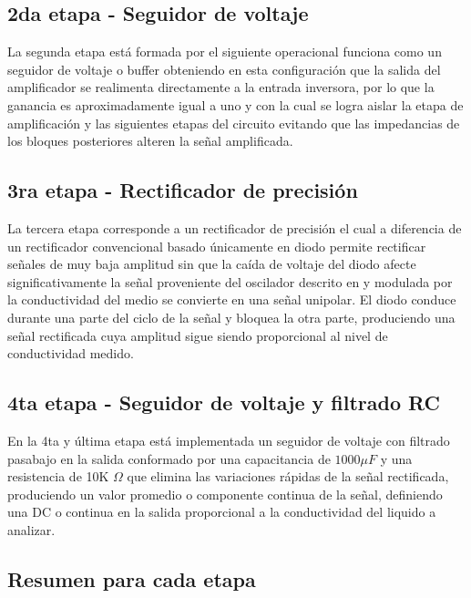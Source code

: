 \documentclass[a4paper,openany,12pt]{book}
\begin{document}
\subsection{2da etapa - Seguidor de voltaje}

La segunda etapa está formada por el siguiente operacional funciona como un seguidor de voltaje o buffer obteniendo en esta configuración que la salida del amplificador se realimenta directamente a la entrada inversora, por lo que la ganancia es aproximadamente igual a uno y con la cual se logra aislar la etapa de amplificación y las siguientes etapas del circuito evitando que las impedancias de los bloques posteriores alteren la señal amplificada.

\subsection{3ra etapa - Rectificador de precisión}

La tercera etapa corresponde a un rectificador de precisión el cual a diferencia de un rectificador convencional basado únicamente en diodo permite rectificar señales de muy baja amplitud sin que la caída de voltaje del diodo afecte significativamente la señal proveniente del oscilador descrito en \cite{franco_design_opamps} y modulada por la conductividad del medio se convierte en una señal unipolar. El diodo conduce durante una parte del ciclo de la señal y bloquea la otra parte, produciendo una señal rectificada cuya amplitud sigue siendo proporcional al nivel de conductividad medido.


\subsection{4ta etapa - Seguidor de voltaje y filtrado RC}

En la 4ta y última etapa está implementada un seguidor de voltaje con filtrado pasabajo en la salida conformado por una capacitancia de $1000\mu F$ y una resistencia de 10K $\Omega$ que elimina las variaciones rápidas de la señal rectificada, produciendo un valor promedio o componente continua de la señal, definiendo una DC o continua en la salida proporcional a la conductividad del liquido a analizar.

\subsection{Resumen para cada etapa}
\end{document}
